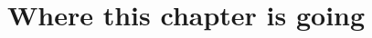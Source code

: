 \providecommand{\NineAMLEn}{}\renewcommand{\NineAMLEn}{1000}
\providecommand{\NineAMLERep}{}\renewcommand{\NineAMLERep}{2000}
\providecommand{\NineAMLEzSd}{}\renewcommand{\NineAMLEzSd}{1.013}
\providecommand{\NineAMLEzMean}{}\renewcommand{\NineAMLEzMean}{0.01}
\providecommand{\NineAMLESS}{}\renewcommand{\NineAMLESS}{0.624}
\providecommand{\NineAMLEseSS}{}\renewcommand{\NineAMLEseSS}{0.021}
\providecommand{\NineAMLESC}{}\renewcommand{\NineAMLESC}{0.197}
\providecommand{\NineAMLEseSC}{}\renewcommand{\NineAMLEseSC}{0.017}
\providecommand{\NineAMLESR}{}\renewcommand{\NineAMLESR}{0.18}
\providecommand{\NineAMLEseSR}{}\renewcommand{\NineAMLEseSR}{0.017}
\providecommand{\NineAMLECS}{}\renewcommand{\NineAMLECS}{0.295}
\providecommand{\NineAMLEseCS}{}\renewcommand{\NineAMLEseCS}{0.025}
\providecommand{\NineAMLECC}{}\renewcommand{\NineAMLECC}{0.705}
\providecommand{\NineAMLEseCC}{}\renewcommand{\NineAMLEseCC}{0.025}
\providecommand{\NineAMLECR}{}\renewcommand{\NineAMLECR}{0}
\providecommand{\NineAMLEseCR}{}\renewcommand{\NineAMLEseCR}{0}
\providecommand{\NineAMLERS}{}\renewcommand{\NineAMLERS}{0.664}
\providecommand{\NineAMLEseRS}{}\renewcommand{\NineAMLEseRS}{0.04}
\providecommand{\NineAMLERC}{}\renewcommand{\NineAMLERC}{0}
\providecommand{\NineAMLEseRC}{}\renewcommand{\NineAMLEseRC}{0}
\providecommand{\NineAMLERR}{}\renewcommand{\NineAMLERR}{0.336}
\providecommand{\NineAMLEseRR}{}\renewcommand{\NineAMLEseRR}{0.04}
\providecommand{\NineAMLEnS}{}\renewcommand{\NineAMLEnS}{518}
\providecommand{\NineAMLEnC}{}\renewcommand{\NineAMLEnC}{342}
\providecommand{\NineAMLEnR}{}\renewcommand{\NineAMLEnR}{140}
\providecommand{\NineARetHalf}{}\renewcommand{\NineARetHalf}{0.9916}
\providecommand{\NineARetSix}{}\renewcommand{\NineARetSix}{0.801}
\providecommand{\NineARetHalfPred}{}\renewcommand{\NineARetHalfPred}{0.992}
\providecommand{\NineARetSumHalf}{}\renewcommand{\NineARetSumHalf}{49.5}
\providecommand{\NineARetSumSix}{}\renewcommand{\NineARetSumSix}{4}
\providecommand{\NineARetWalkers}{}\renewcommand{\NineARetWalkers}{10\,000}
\providecommand{\NineARetSteps}{}\renewcommand{\NineARetSteps}{10\,000}
\providecommand{\NineARetStirTen}{}\renewcommand{\NineARetStirTen}{0.9876}
\providecommand{\NineACycJ}{}\renewcommand{\NineACycJ}{0.1333}
\providecommand{\NineACycLam}{}\renewcommand{\NineACycLam}{0.4}
\providecommand{\NineACycTVTen}{}\renewcommand{\NineACycTVTen}{7.0\times10^{-5}}
\section*{Where this chapter is going}
\label{9a:sec:roadmap}

